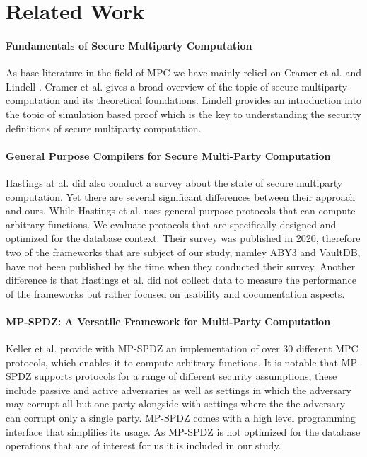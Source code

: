 \section {Related Work}
\paragraph{Fundamentals of Secure Multiparty Computation}
As base literature in the field of MPC we have mainly relied on Cramer et al.\cite{cramer2005multiparty} and Lindell \cite{lindell2017simulate}. Cramer et al. gives a broad overview of the topic of secure multiparty computation and its theoretical foundations. Lindell provides an introduction into the topic of simulation based proof which is the key to understanding the security definitions of secure multiparty computation.



\paragraph{ General Purpose Compilers for Secure Multi-Party Computation}
Hastings at al. \cite{hastings2019sok} did also conduct a survey about the state of secure multiparty computation. Yet there are several significant differences between their approach and ours. While Hastings et al. uses general purpose protocols that can compute arbitrary functions.  We evaluate protocols that are specifically designed and optimized for the database context. Their survey was published in 2020, therefore two of the frameworks that are subject of our study, namley ABY3 and VaultDB, have not been published by the time when they conducted their survey. Another difference is that Hastings et al. did not collect data to measure the performance of the frameworks but rather focused on usability and documentation aspects.

\paragraph{MP-SPDZ: A Versatile Framework for Multi-Party Computation}
Keller et al. \cite{hastings2019sok} provide with MP-SPDZ an implementation of over 30 different MPC protocols, which enables it  to compute arbitrary functions. It is notable that MP-SPDZ supports protocols for a range of different security assumptions, these include passive and active adversaries as well as settings in which the adversary may corrupt all but one party alongside with settings where the the adversary can corrupt only a single party. MP-SPDZ comes with a high level programming interface that simplifies its usage. As MP-SPDZ is not optimized for the database operations that are of interest for us it is included in our study. 